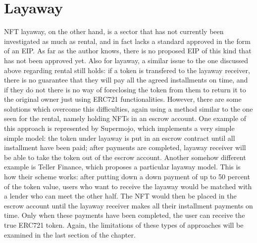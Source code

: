 \documentclass[english, LaM, oneside]{sapthesis}%
\begin{document}
\section{Layaway}
NFT layaway, on the other hand, is a sector that has not currently been investigated as much as rental, and in fact lacks a standard approved in the form of an EIP. As far as the author knows, there is no proposed EIP of this kind that has not been approved yet.\newline
Also for layaway, a similar issue to the one discussed above regarding rental still holds: if a token is transfered to the layaway receiver, there is no guarantee that they will pay all the agreed installments on time, and if they do not there is no way of foreclosing the token from them to return it to the original owner just using ERC721 functionalities.\newline
However, there are some solutions which overcome this difficulties, again using a method similar to the one seen for the rental, namely holding NFTs in an escrow account.\newline 
One example of this approach is represented by Supermojo\cite{ref:supermojo}, which implements a very simple simple model: the token under layaway is put in an escrow contract until all installment have been paid; after payments are completed, layaway receiver will be able to take the token out of the escrow account.\newline
Another somehow different example is Teller Finance\cite{ref:teller}, which proposes a  particular layaway model. This is how their scheme works: after putting down a down payment of up to 50 percent of the token value, users who want to receive the layaway would be matched with a lender who can meet the other half.
The NFT would then be placed in the escrow account until the layaway receiver makes all their installment payments on time. Only when these payments have been completed, the user can receive the true ERC721 token.\newline
Again, the limitations of these types of approaches will be examined in the last section of the chapter.
\end{document}

